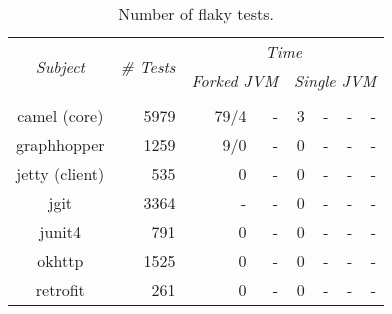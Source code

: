 \begin{table*}[t]
  \centering
  \begin{tabular}{|c|r|r|r|r|r|r|r|}
    \hline
    \multirow{2}{*}{\emph{Subject}} & \multirow{2}{*}{\emph{\# Tests}} &  \multicolumn{6}{c|}{\emph{Time}}\\
    \cline{3-8}
    & & \multicolumn{2}{c|}{\emph{Forked JVM}} & \multicolumn{4}{c|}{\emph{Single JVM}}   \\
    \cline{3-8}
    & & \multicolumn{1}{c|}{\Seq{}} & \multicolumn{1}{c|}{\ParClassSeqMeth{}} & \multicolumn{1}{c|}{\Seq{}} & \multicolumn{1}{c|}{\ParClassSeqMeth{}} & \multicolumn{1}{c|}{\SeqClassParMeth{}} & \multicolumn{1}{c|}{\ParClassParMeth{}}\\     \hline 
    camel (core) & 5979 & 79/4 & - & 3 & - & - & - \\
    \hline
    graphhopper & 1259 & 9/0 & - & 0 & - & - & - \\
    \hline
    jetty (client) & 535 & 0 & - & 0 & - & - & - \\
    \hline
    jgit & 3364 & - & - & 0 & - & - & - \\
    \hline
    junit4 & 791 & 0 & - & 0 & - & - & - \\
    \hline
    okhttp & 1525 & 0 & - & 0 & - & - & - \\
    \hline
    retrofit & 261 & 0 & - & 0 & - & - & - \\
    \hline
  \end{tabular}
  \caption{\label{table:failures}Number of flaky tests.}
\end{table*}

